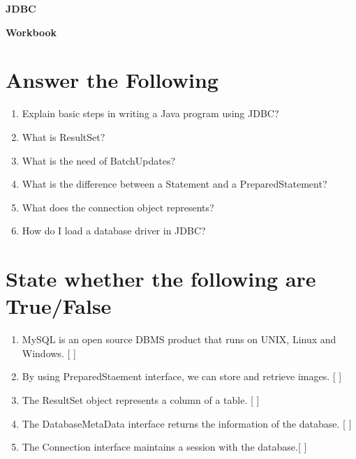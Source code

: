 \documentclass[11pt,a4paper]{article}
\def\AnswerBox{\fbox{\begin{minipage}{4in}\hfill\vspace{0.5in}\end{minipage}}}
\begin{document}
\centerline{\huge{ \textbf{JDBC}}}

\vspace{1pc}

\centerline{\huge{ \textbf{ Workbook}}}

\section*{Answer the Following}
\begin{enumerate}\itemsep10pt

\item Explain basic steps in writing a Java program using JDBC?

\AnswerBox

\item What is ResultSet?

\AnswerBox

\item What is the need of BatchUpdates?

\AnswerBox

\item What is the difference between a Statement and a PreparedStatement?

\AnswerBox

\item What does the connection object represents?

\AnswerBox

\item How do I load a database driver in JDBC?

\AnswerBox

\end{enumerate}

\section*{State whether the following are True/False}
\begin{enumerate}
\item MySQL is an open source DBMS product that runs on UNIX, Linux and Windows. [   ]
\item By using PreparedStaement interface, we can store and retrieve images. [   ]
\item The ResultSet object represents a column of a table. [   ]
\item The DatabaseMetaData interface returns the information of the database. [  ]
\item The Connection interface maintains a session with the database.[   ]

\end{enumerate}
\end{document}
